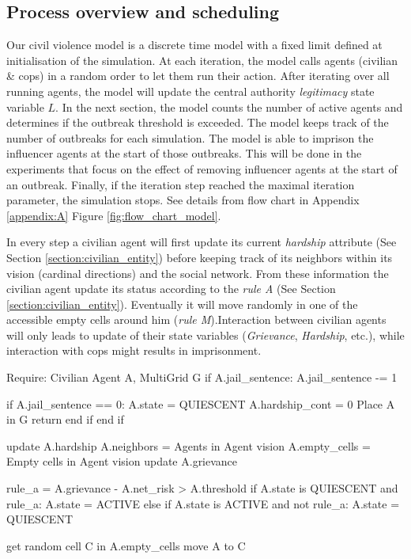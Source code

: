 \documentclass[10pt]{article}
\begin{document}
    \subsection{Process overview and scheduling}

    Our civil violence model is a discrete time model with a fixed limit defined at initialisation of the simulation. At each iteration, the model calls agents (civilian \& cops) in a random order to let them run their action. After iterating over all running agents, the model will update the central authority \emph{legitimacy} state variable $L$. In the next section, the model counts the number of active agents and determines if the outbreak threshold is exceeded. The model keeps track of the number of outbreaks for each simulation. The model is able to imprison the influencer agents at the start of those outbreaks. This will be done in the experiments that focus on the effect of removing influencer agents at the start of an outbreak. Finally, if the iteration step reached the maximal iteration parameter, the simulation stops. See details from flow chart in Appendix \ref{appendix:A} Figure \ref{fig:flow_chart_model}.

    In every step a civilian agent will first update its current \emph{hardship} attribute (See Section \ref{section:civilian_entity}) before keeping track of its neighbors within its vision (cardinal directions) and the social network. From these information the civilian agent update its status according to the \emph{rule A} (See Section \ref{section:civilian_entity}). Eventually it will move randomly in one of the accessible empty cells around him (\emph{rule M}).Interaction between civilian agents will only leads to update of their state variables (\emph{Grievance}, \emph{Hardship}, etc.), while interaction with cops might results in imprisonment.


    \begin{algorithm}[caption = {Role: Civilian agent}]
        Require: Civilian Agent A, MultiGrid G
        if A.jail_sentence:
        A.jail_sentence -= 1

        if A.jail_sentence == 0:
        A.state = QUIESCENT
        A.hardship_cont = 0
        Place A in G
        return
        end if
        end if

        update A.hardship
        A.neighbors     = Agents in Agent vision
        A.empty_cells   = Empty cells in Agent vision
        update A.grievance

        rule_a = A.grievance - A.net_risk > A.threshold
        if A.state is QUIESCENT and rule_a:
        A.state = ACTIVE
        else if A.state is ACTIVE and not rule_a:
        A.state = QUIESCENT

        get random cell C in A.empty_cells
        move A to C
    \end{algorithm}
\end{document}

